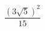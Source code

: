 \begin{ex}[type=calculate]
	\begin{condition}
		\( \dfrac{(3\sqrt{5})^2}{15} \)
	\end{condition}
\end{ex}
